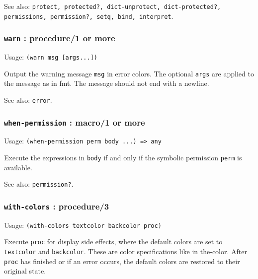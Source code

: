 \documentclass[
]{article}
\newcommand{\passthrough}[1]{#1}
\begin{document}
See also:
\passthrough{\lstinline!protect, protected?, dict-unprotect, dict-protected?, permissions, permission?, setq, bind, interpret!}.

\hypertarget{warn-procedure1-or-more}{%
\subsubsection{\texorpdfstring{\texttt{warn} : procedure/1 or
more}{warn : procedure/1 or more}}\label{warn-procedure1-or-more}}

Usage: \passthrough{\lstinline!(warn msg [args...])!}

Output the warning message \passthrough{\lstinline!msg!} in error
colors. The optional \passthrough{\lstinline!args!} are applied to the
message as in fmt. The message should not end with a newline.

See also: \passthrough{\lstinline!error!}.

\hypertarget{when-permission-macro1-or-more}{%
\subsubsection{\texorpdfstring{\texttt{when-permission} : macro/1 or
more}{when-permission : macro/1 or more}}\label{when-permission-macro1-or-more}}

Usage: \passthrough{\lstinline!(when-permission perm body ...) => any!}

Execute the expressions in \passthrough{\lstinline!body!} if and only if
the symbolic permission \passthrough{\lstinline!perm!} is available.

See also: \passthrough{\lstinline!permission?!}.

\hypertarget{with-colors-procedure3}{%
\subsubsection{\texorpdfstring{\texttt{with-colors} :
procedure/3}{with-colors : procedure/3}}\label{with-colors-procedure3}}

Usage: \passthrough{\lstinline!(with-colors textcolor backcolor proc)!}

Execute \passthrough{\lstinline!proc!} for display side effects, where
the default colors are set to \passthrough{\lstinline!textcolor!} and
\passthrough{\lstinline!backcolor!}. These are color specifications like
in the-color. After \passthrough{\lstinline!proc!} has finished or if an
error occurs, the default colors are restored to their original state.
\end{document}
